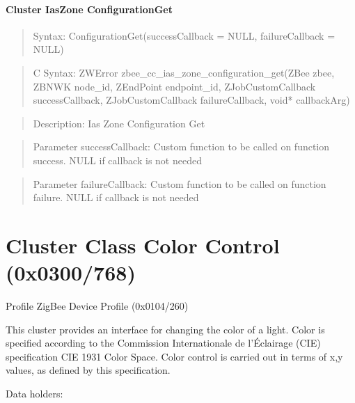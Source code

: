 \paragraph{Cluster IasZone ConfigurationGet}
\begin{quote}Syntax: ConfigurationGet(successCallback = NULL, failureCallback = NULL)\end{quote}
\begin{quote}C Syntax: ZWError zbee\_cc\_ias\_zone\_configuration\_get(ZBee zbee, ZBNWK node\_id, ZEndPoint endpoint\_id, ZJobCustomCallback successCallback, ZJobCustomCallback failureCallback, void* callbackArg)\end{quote}
\begin{quote}Description: Ias Zone Configuration Get\end{quote}
\begin{quote}Parameter successCallback: Custom function to be called on function success. NULL if callback is not needed\end{quote}
\begin{quote}Parameter failureCallback: Custom function to be called on function failure. NULL if callback is not needed\end{quote}



\section{Cluster Class Color Control (0x0300/768)}

Profile ZigBee Device Profile (0x0104/260)

This cluster provides an interface for changing the color of a light. Color is specified according to the Commission Internationale de l'Éclairage (CIE) specification CIE 1931 Color Space. Color control is carried out in terms of x,y values, as defined by this specification.
\newline

\noindent
Data holders:

